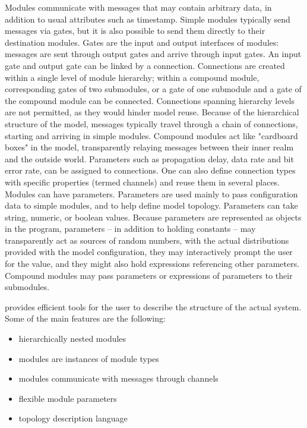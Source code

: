 Modules communicate with messages that may contain arbitrary
data, in addition to usual attributes such as timestamp.
Simple modules typically send messages via gates, but it is also
possible to send them directly to their destination modules. Gates are the
input and output interfaces of modules: messages are sent through
output gates and arrive through input gates. An input gate and output gate
can be linked by a connection. Connections are created within a single
level of module hierarchy; within a compound module, corresponding gates of
two submodules, or a gate of one submodule and a gate of the compound
module can be connected. Connections spanning hierarchy levels are
not permitted, as they would hinder model reuse. Because of the hierarchical
structure of the model, messages typically travel through a chain of
connections, starting and arriving in simple modules. Compound modules act like
"cardboard boxes" in the model, transparently relaying messages between
their inner realm and the outside world. Parameters such as propagation delay,
data rate and bit error rate, can be assigned to connections. One can also
define connection types with specific properties (termed channels) and
reuse them in several places. Modules can have parameters. Parameters are
used mainly to pass configuration data to simple modules, and to help
define model topology. Parameters can take string, numeric, or boolean
values. Because parameters are represented as objects in the program,
parameters -- in addition to holding constants -- may transparently act as
sources of random numbers, with the actual distributions provided with the
model configuration, they may interactively prompt the user for the value,
and they might also hold expressions referencing other parameters. Compound
modules may pass parameters or expressions of parameters to their
submodules.


{\opp} provides efficient tools for the user to describe the
structure of the actual system. Some of the main features are the following:
\begin{itemize}
\item{hierarchically nested modules}
\item{modules are instances of module types}
\item{modules communicate with messages through channels}
\item{flexible module parameters}
\item{topology description language}
\end{itemize}

